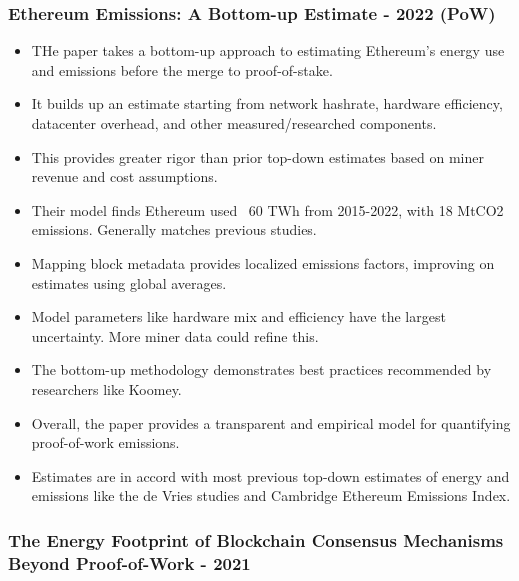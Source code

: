 \documentclass{article}
\begin{document}
\subsubsection{Ethereum Emissions: A Bottom-up Estimate - 2022 (PoW)} \cite{mcdonaldEthereumEmissionsBottomup2022}
\begin{itemize}
    \item THe paper takes a bottom-up approach to estimating Ethereum's energy use and emissions before the merge to proof-of-stake.
    \item It builds up an estimate starting from network hashrate, hardware efficiency, datacenter overhead, and other measured/researched components.
    \item This provides greater rigor than prior top-down estimates based on miner revenue and cost assumptions.
    \item Their model finds Ethereum used ~60 TWh from 2015-2022, with 18 MtCO2 emissions. Generally matches previous studies.
    \item Mapping block metadata provides localized emissions factors, improving on estimates using global averages.
    \item Model parameters like hardware mix and efficiency have the largest uncertainty. More miner data could refine this.
    \item The bottom-up methodology demonstrates best practices recommended by researchers like Koomey.
    \item Overall, the paper provides a transparent and empirical model for quantifying proof-of-work emissions.
    \item Estimates are in accord with most previous top-down estimates of energy and emissions like the de Vries studies and Cambridge Ethereum Emissions Index.
\end{itemize}

\subsubsection{The Energy Footprint of Blockchain Consensus Mechanisms Beyond Proof-of-Work - 2021} \cite{plattEnergyFootprintBlockchain2021}
\end{document}

